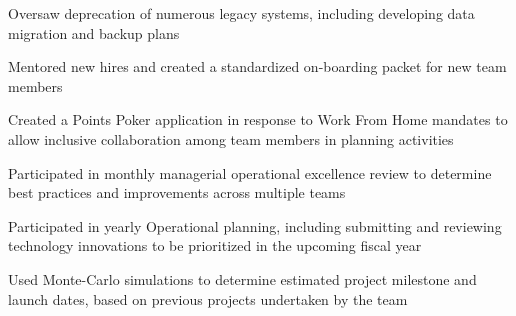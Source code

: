 \documentclass[11pt, a4paper]{awesomecv}
\begin{document}
\begin{cventries}
{\begin{cvitems}
                    \item{Oversaw deprecation of numerous legacy systems, including developing data migration and backup plans}
                    \item{Mentored new hires and created a standardized on-boarding packet for new team members}
                    \item{Created a Points Poker application in response to Work From Home mandates to allow inclusive collaboration among team members in planning activities}
                    \item{Participated in monthly managerial operational excellence review to determine best practices and improvements across multiple teams}
                    \item{Participated in yearly Operational planning, including submitting and reviewing technology innovations to be prioritized in the upcoming fiscal year}
                    \item{Used Monte-Carlo simulations to determine estimated project milestone and launch dates, based on previous projects undertaken by the team}
          \end{cvitems}
    }
 

\end{cventries}
\end{document}
